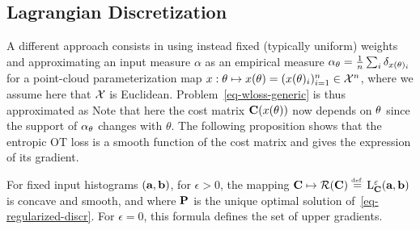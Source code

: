 \subsection{Lagrangian Discretization}

A different approach consists in using instead fixed (typically uniform) weights and approximating an input measure $\alpha$ as an empirical measure $\al_\th = \frac{1}{n}\sum_i \de_{x(\th)_i}$ for a point-cloud parameterization map $x : \th \mapsto x(\th) = (x(\th)_i)_{i=1}^n \in \Xx^n$, where we assume here that $\X$ is Euclidean. Problem~\eqref{eq-wloss-generic} is thus approximated as
Note that here the cost matrix $\C(x(\th))$ now depends on $\th$ since the support of $\al_\th$ changes with $\theta$.
%
The following proposition shows that the entropic OT loss is a smooth function of the cost matrix and gives the expression of its gradient.

\begin{proposition}
For fixed input histograms $(\a,\b)$, for $\epsilon>0$, the mapping $\C \mapsto \Rr(\C) \eqdef \MKD_\C^\epsilon(\a,\b)$ is concave and smooth, and  
\eql{\label{eq-diff-cost}
	\nabla \Rr(\C) = \P, 
}
where $\P$ is the unique optimal solution of~\eqref{eq-regularized-discr}. 
%
For $\epsilon=0$, this formula defines the set of upper gradients. 
\end{proposition}



